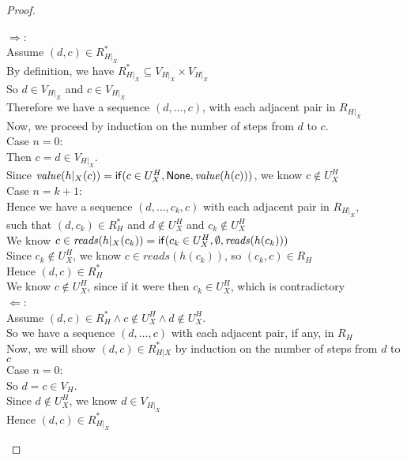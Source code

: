 \begin{proof}

\begin{tabbedproof}
\oo $\Rightarrow$: \\
\ooo Assume $(d,c) \in R^*_{H|_X} $ \\
\ooo By definition, we have $R^\ast_{H|_X} \subseteq V_{H|_X} \times V_{H|_X}$ \\
\ooo So $d \in V_{H|_X}$ and $c \in V_{H|_X}$ \\
\ooo Therefore we have a sequence $(d, \ldots, c)$, with each adjacent pair in $R_{H|_X}$ \\
\ooo Now, we proceed by induction on the number of steps from $d$ to $c$. \\
\ooo Case $n = 0$: \\
\oooo Then $c = d \in V_{H|_X}$.\\
\oooo Since $\mathit{value}(h|_{X}(c)) = \mathsf{if}({c \in U^H_X}, {\mathsf{None}}, {\mathit{value}(h(c))})$, we know $c \not\in U^H_X$ \\
\ooo Case $n = k+1$: \\
\oooo Hence we have a sequence $(d, \ldots, c_k, c)$ with each adjacent pair in $R_{H|_X}$, \\
\oooo such that $(d, c_k) \in R^*_H$ and $d \not \in U^H_X$ and $c_k \not \in U^H_X$ \\ 
\oooo We know $c \in \mathit{reads}(h|_X(c_k)) = \mathsf{if}({c_k \in U^H_X}, {\emptyset}, {\mathit{reads}(h(c_k))})$ \\
\oooo Since $c_k \not \in U^H_X$, we know $c \in \mathit{reads}(h(c_k))$, so $(c_k, c) \in R_H$ \\
\oooo Hence $(d, c) \in R^*_H$ \\
\oooo We know $c \not \in U^H_X$, since if it were then $c_k \in U^H_X$, which is contradictory \\
\oo $\Leftarrow$: \\
\ooo Assume $(d,c) \in R^*_H \land c \not\in U^H_X \land d \not\in U^H_X$. \\
\ooo So we have a sequence $(d, \ldots, c)$ with each adjacent pair, if any, in $R_H$ \\
\ooo Now, we will show $(d, c) \in R^*_{H|X}$ by induction on the number of steps from $d$ to $c$ \\
\ooo Case $n = 0$: \\
\oooo So $d = c \in V_H$. \\
\oooo Since $d \not\in U^H_X$, we know $d \in V_{H|_X}$ \\
\oooo Hence $(d,c) \in R^*_{H|_X}$ \\

\end{tabbedproof}
\end{proof}
